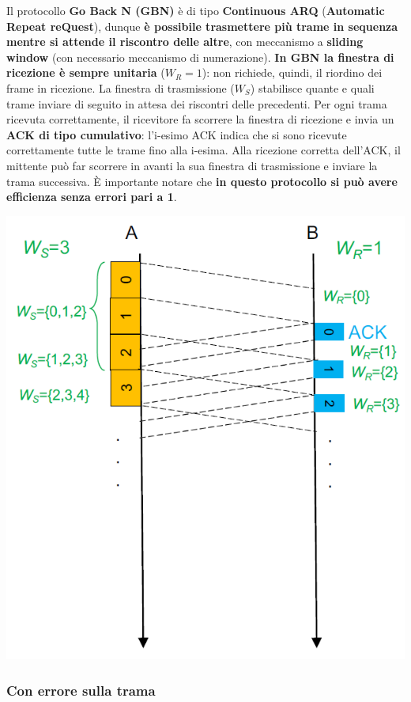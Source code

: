 \documentclass[12pt]{article}
\begin{document}
Il protocollo \textbf{Go Back N (GBN)} è di tipo \textbf{Continuous ARQ} (\textbf{Automatic Repeat reQuest}), dunque \textbf{è possibile trasmettere più trame in sequenza mentre si attende il riscontro delle altre}, con meccanismo a \textbf{sliding window} (con necessario meccanismo di numerazione). \textbf{In GBN la finestra di ricezione è sempre unitaria} ($W_R=1$): non richiede, quindi, il riordino dei frame in ricezione. La finestra di trasmissione ($W_S$) stabilisce quante e quali trame inviare di seguito in attesa dei riscontri delle precedenti. Per ogni trama ricevuta correttamente, il ricevitore fa scorrere la finestra di ricezione e invia un \textbf{ACK di tipo cumulativo}: l'i-esimo ACK indica che si sono ricevute correttamente tutte le trame fino alla i-esima. Alla ricezione corretta dell'ACK, il mittente può far scorrere in avanti la sua finestra di trasmissione e inviare la trama successiva. È importante notare che \textbf{in questo protocollo si può avere efficienza senza errori pari a 1}.

\begin{center}
    \includegraphics[scale=0.3]{go_back_n}
\end{center}

\subsubsection{Con errore sulla trama}
\end{document}
